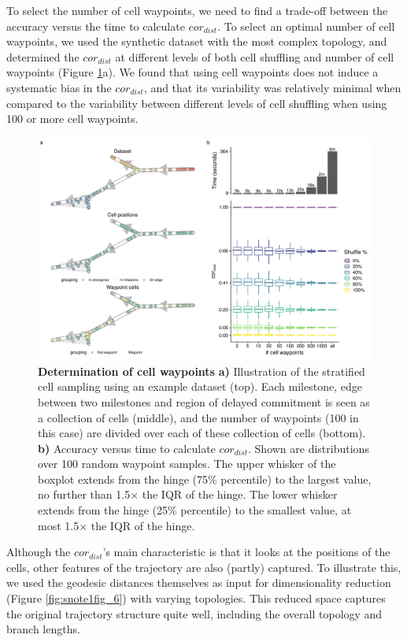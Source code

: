 To select the number of cell waypoints, we need to find a trade-off between the accuracy versus the time to calculate $\textit{cor}_{\textit{dist}}$. To select an optimal number of cell waypoints, we used the synthetic dataset with the most complex topology, and determined the $\textit{cor}_{\textit{dist}}$ at different levels of both cell shuffling and number of cell waypoints (Figure \ref{fig:snote1fig_5}a). We found that using cell waypoints does not induce a systematic bias in the $\textit{cor}_{\textit{dist}}$, and that its variability was relatively minimal when compared to the variability between different levels of cell shuffling when using 100 or more cell waypoints.

\begin{figure}[htb!]
	\centering\includegraphics[width=\linewidth]{fig/snote1fig_5.pdf}
	\caption{
		\textbf{Determination of cell waypoints} \textbf{a)} Illustration of the stratified cell sampling using an example dataset (top). Each milestone, edge between two milestones and region of delayed commitment is seen as a collection of cells (middle), and the number of waypoints (100 in this case) are divided over each of these collection of cells (bottom). \textbf{b)} Accuracy versus time to calculate $\textit{cor}_{\textit{dist}}$. Shown are distributions over 100 random waypoint samples. The upper whisker of the boxplot extends from the hinge (75$\%$ percentile) to the largest value, no further than 1.5$\times$ the IQR of the hinge. The lower whisker extends from the hinge (25$\%$ percentile) to the smallest value, at most 1.5$\times$ the IQR of the hinge.
	}
	\label{fig:snote1fig_5}
\end{figure}

Although the $\textit{cor}_{\textit{dist}}$'s main characteristic is that it looks at the positions of the cells, other features of the trajectory are also (partly) captured. To illustrate this, we used the geodesic distances themselves as input for dimensionality reduction (Figure \ref{fig:snote1fig_6}) with varying topologies. This reduced space captures the original trajectory structure quite well, including the overall topology and branch lengths.

